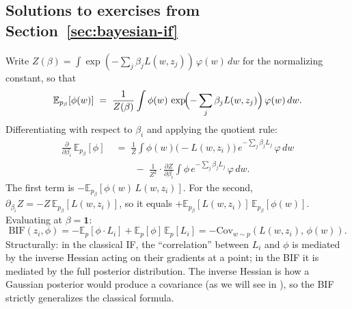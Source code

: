\documentclass[11pt]{article}
\newcommand{\E}{\mathbb{E}}
\begin{document}
\begin{pdfonly}\begin{solutionsonly}
\subsection{Solutions to exercises from Section~\ref{sec:bayesian-if}}
\end{solutionsonly}\end{pdfonly}

\begin{solution}

Write $Z(\beta) = \int \exp(-\sum_j \beta_j L(w,z_j))\,\varphi(w)\,dw$ for the normalizing constant, so that
\[
  \E_{p_\beta}[\phi(w)] \;=\; \frac{1}{Z(\beta)}\int \phi(w)\,\exp\!\Bigl(-\sum_j \beta_j L(w,z_j)\Bigr)\,\varphi(w)\,dw.
\]
Differentiating with respect to $\beta_i$ and applying the quotient rule:
\begin{align*}
  \frac{\partial}{\partial\beta_i}\,\E_{p_\beta}[\phi] &\;=\; \frac{1}{Z}\int \phi(w)\bigl(-L(w,z_i)\bigr)\,e^{-\sum_j\beta_j L_j}\,\varphi\,dw \\
  &\qquad\;-\; \frac{1}{Z^2}\cdot\frac{\partial Z}{\partial\beta_i}\int \phi\,e^{-\sum_j\beta_j L_j}\,\varphi\,dw.
\end{align*}
The first term is $-\E_{p_\beta}[\phi(w)\,L(w,z_i)]$. For the second, $\partial_{\beta_i}Z = -Z\,\E_{p_\beta}[L(w,z_i)]$, so it equals $+\E_{p_\beta}[L(w,z_i)]\,\E_{p_\beta}[\phi(w)]$. Evaluating at $\beta=\mathbf{1}$:
\[
  \mathrm{BIF}(z_i,\phi) = -\E_p[\phi\cdot L_i] + \E_p[\phi]\,\E_p[L_i] = -\mathrm{Cov}_{w\sim p}(L(w,z_i),\,\phi(w)).
\]
Structurally: in the classical IF, the ``correlation'' between $L_i$ and $\phi$ is mediated by the inverse Hessian acting on their gradients at a point; in the BIF it is mediated by the full posterior distribution. The inverse Hessian is how a Gaussian posterior would produce a covariance (as we will see in ), so the BIF strictly generalizes the classical formula.

\end{solution}
\end{document}
